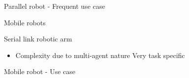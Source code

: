 \documentclass[usenames,dvipsnames,xcolor=table]{beamer}
\begin{document}
\begin{frame}{Parallel robot - Frequent use case}
    \begin{center}
    \end{center}
\end{frame}
\begin{frame}{Mobile robots}
    \begin{center}
        \begin{minipage}{0.49\linewidth}
                \def\svgwidth{\linewidth}
                
        \end{minipage}
        \hfill
        \begin{minipage}{0.49\linewidth}
        \large{Serial link robotic arm}
        \begin{itemize}
            \pro Increases efficiency in warehouses
            \pro Semi-autonomous systems
            \item[]
            \con Complexity due to multi-agent nature
            \con Very task specific
        \end{itemize}
        \end{minipage}
    \end{center}
\end{frame}

\begin{frame}{Mobile robot - Use case}
    \begin{center}
    \end{center}
\end{frame}

\end{document}
